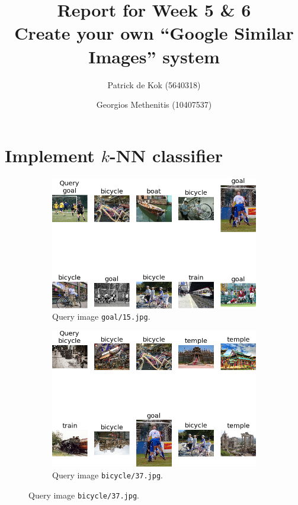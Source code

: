 \documentclass[a4paper,10pt,twoside]{article}
\title{Report for Week 5 \& 6\\\normalsize Create your own ``Google Similar Images'' system}
\author{Patrick de Kok (5640318) \and Georgios Methenitis (10407537)}
\begin{document}
\maketitle
\thispagestyle{empty}

\section{Implement $k$-NN classifier}

\begin{figure}
  \begin{subfigure}{.47\textwidth}
    \centering
    \includegraphics[width=1\textwidth]{knn_goal15}
    \caption{Query image \texttt{goal/15.jpg}.}
  \end{subfigure}
  \hspace*{\fill}
  \begin{subfigure}{.47\textwidth}
    \centering
    \includegraphics[width=1\textwidth]{knn_bicycle37}
    \caption{Query image \texttt{bicycle/37.jpg}.}
  \end{subfigure}


\end{figure}
\end{document}
